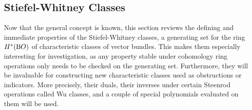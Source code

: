 \subsection{Stiefel-Whitney Classes}
\label{sec:swclasses}
Now that the general concept is known, this section reviews the
defining and immediate properties of the Stiefel-Whitney
classes, a generating set for the ring $H^*(\mathrm{B}O)$ of characteristic
classes of vector bundles.
This makes them especially interesting for investigation,
as any property stable under cohomology ring operations only needs to
be checked on the generating set.
Furthermore, they will be invaluable for constructing new
characteristic classes used as obstructions or indicators.
More precisely, their duals, their inverses under certain Steenrod
operations called Wu classes, and a couple of special polynomials
evaluated on them will be used.

